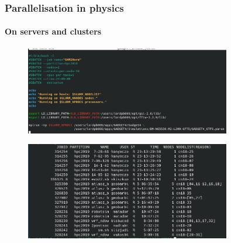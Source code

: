 \begin{frame}
\frametitle{Parallelisation in physics}
\framesubtitle{On servers and clusters}

\begin{figure}
	\includegraphics[width=0.8\textwidth]{img/slurm-job.png}
\end{figure}
	
\begin{figure}
	\includegraphics[width=0.8\textwidth]{img/slurm-squeue.png}
\end{figure}

\end{frame}